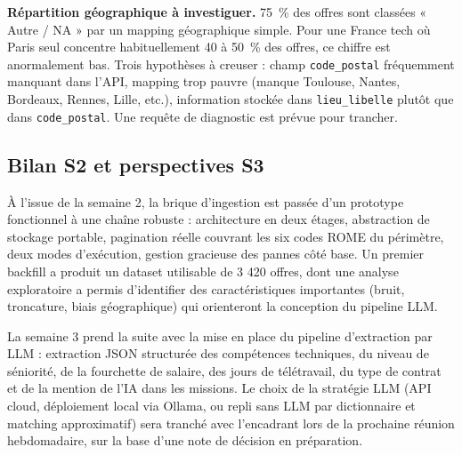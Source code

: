 \documentclass[12pt, a4paper]{article}
\begin{document}
\textbf{Répartition géographique à investiguer.} 75~\% des offres sont classées « Autre / NA » par un mapping géographique simple. Pour une France tech où Paris seul concentre habituellement 40 à 50~\% des offres, ce chiffre est anormalement bas. Trois hypothèses à creuser : champ \texttt{code\_postal} fréquemment manquant dans l'API, mapping trop pauvre (manque Toulouse, Nantes, Bordeaux, Rennes, Lille, etc.), information stockée dans \texttt{lieu\_libelle} plutôt que dans \texttt{code\_postal}. Une requête de diagnostic est prévue pour trancher.


\subsection{Bilan S2 et perspectives S3}

À l'issue de la semaine 2, la brique d'ingestion est passée d'un prototype fonctionnel à une chaîne robuste : architecture en deux étages, abstraction de stockage portable, pagination réelle couvrant les six codes ROME du périmètre, deux modes d'exécution, gestion gracieuse des pannes côté base. Un premier backfill a produit un dataset utilisable de 3 420 offres, dont une analyse exploratoire a permis d'identifier des caractéristiques importantes (bruit, troncature, biais géographique) qui orienteront la conception du pipeline LLM.

La semaine 3 prend la suite avec la mise en place du pipeline d'extraction par LLM : extraction JSON structurée des compétences techniques, du niveau de séniorité, de la fourchette de salaire, des jours de télétravail, du type de contrat et de la mention de l'IA dans les missions. Le choix de la stratégie LLM (API cloud, déploiement local via Ollama, ou repli sans LLM par dictionnaire et matching approximatif) sera tranché avec l'encadrant lors de la prochaine réunion hebdomadaire, sur la base d'une note de décision en préparation.
\end{document}
